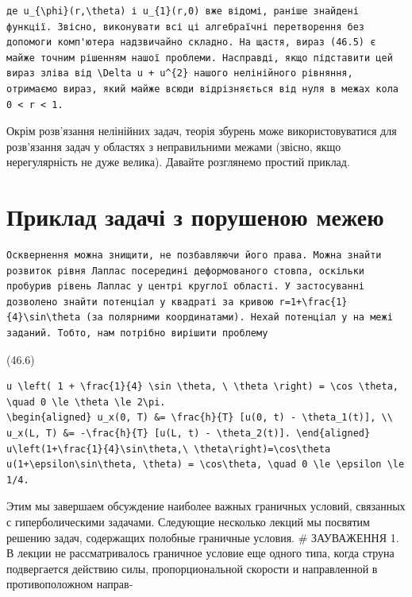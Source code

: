 \documentclass[
  ukrainian,
]{article}
\begin{document}
\begin{verbatim}
де u_{\phi}(r,\theta) і u_{1}(r,0) вже відомі, раніше знайдені функції. Звісно, виконувати всі ці алгебраїчні перетворення без допомоги комп'ютера надзвичайно складно. На щастя, вираз (46.5) є майже точним рішенням нашої проблеми. Насправді, якщо підставити цей вираз зліва від \Delta u + u^{2} нашого нелінійного рівняння, отримаємо вираз, який майже всюди відрізняється від нуля в межах кола 0 < r < 1.
\end{verbatim}

Окрім розв'язання нелінійних задач, теорія збурень може
використовуватися для розв'язання задач у областях з неправильними
межами (звісно, якщо нерегулярність не дуже велика). Давайте розглянемо
простий приклад.

\section{Приклад задачі з порушеною
межею}\label{ux43fux440ux438ux43aux43bux430ux434-ux437ux430ux434ux430ux447ux456-ux437-ux43fux43eux440ux443ux448ux435ux43dux43eux44e-ux43cux435ux436ux435ux44e}

\begin{verbatim}
Осквернення можна знищити, не позбавляючи його права. Можна знайти розвиток рівня Лаплас посередині деформованого стовпа, оскільки пробурив рівень Лаплас у центрі круглої області. У застосуванні дозволено знайти потенціал у квадраті за кривою r=1+\frac{1}{4}\sin\theta (за полярними координатами). Нехай потенціал у на межі заданий. Тобто, нам потрібно вирішити проблему
\end{verbatim}

(46.6)

\begin{verbatim}
u \left( 1 + \frac{1}{4} \sin \theta, \ \theta \right) = \cos \theta, \quad 0 \le \theta \le 2\pi.
\begin{aligned} u_x(0, T) &= \frac{h}{T} [u(0, t) - \theta_1(t)], \\ u_x(L, T) &= -\frac{h}{T} [u(L, t) - \theta_2(t)]. \end{aligned}
u\left(1+\frac{1}{4}\sin\theta,\ \theta\right)=\cos\theta
u(1+\epsilon\sin\theta, \theta) = \cos\theta, \quad 0 \le \epsilon \le 1/4.
\end{verbatim}

Этим мы завершаем обсуждение наиболее важных граничных условий,
связанных с гиперболическими задачами. Следующие несколько лекций мы
посвятим решению задач, содержащих полобные граничные условия. \#
ЗАУВАЖЕННЯ 1. В лекции не рассматривалось граничное условие еще одного
типа, когда струна подвергается действию силы, пропорциональной скорости
и направленной в противоположном направ-
\end{document}
